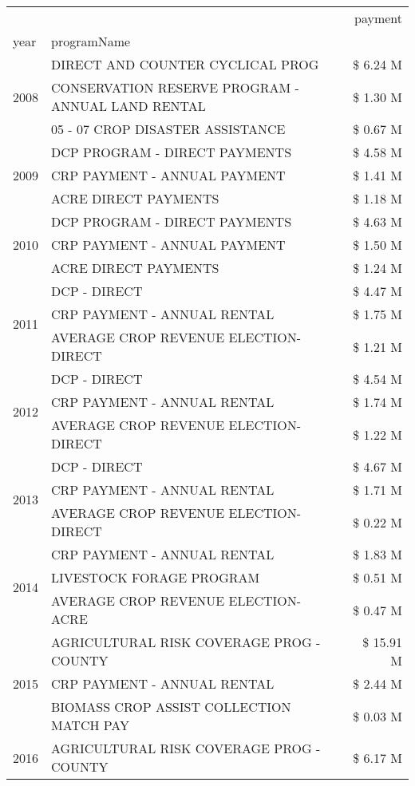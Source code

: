 \begin{tabular}{llr}
\toprule
 &  & payment \\
year & programName &  \\
\midrule
\multirow[t]{3}{*}{2008} & DIRECT AND COUNTER CYCLICAL PROG & \$ 6.24 M \\
 & CONSERVATION RESERVE PROGRAM - ANNUAL LAND RENTAL & \$ 1.30 M \\
 & 05 - 07 CROP DISASTER ASSISTANCE & \$ 0.67 M \\
\cline{1-3}
\multirow[t]{3}{*}{2009} & DCP PROGRAM - DIRECT PAYMENTS & \$ 4.58 M \\
 & CRP PAYMENT - ANNUAL PAYMENT & \$ 1.41 M \\
 & ACRE DIRECT PAYMENTS & \$ 1.18 M \\
\cline{1-3}
\multirow[t]{3}{*}{2010} & DCP PROGRAM - DIRECT PAYMENTS & \$ 4.63 M \\
 & CRP PAYMENT - ANNUAL PAYMENT & \$ 1.50 M \\
 & ACRE DIRECT PAYMENTS & \$ 1.24 M \\
\cline{1-3}
\multirow[t]{3}{*}{2011} & DCP - DIRECT & \$ 4.47 M \\
 & CRP PAYMENT - ANNUAL RENTAL & \$ 1.75 M \\
 & AVERAGE CROP REVENUE ELECTION-DIRECT & \$ 1.21 M \\
\cline{1-3}
\multirow[t]{3}{*}{2012} & DCP - DIRECT & \$ 4.54 M \\
 & CRP PAYMENT - ANNUAL RENTAL & \$ 1.74 M \\
 & AVERAGE CROP REVENUE ELECTION-DIRECT & \$ 1.22 M \\
\cline{1-3}
\multirow[t]{3}{*}{2013} & DCP - DIRECT & \$ 4.67 M \\
 & CRP PAYMENT - ANNUAL RENTAL & \$ 1.71 M \\
 & AVERAGE CROP REVENUE ELECTION-DIRECT & \$ 0.22 M \\
\cline{1-3}
\multirow[t]{3}{*}{2014} & CRP PAYMENT - ANNUAL RENTAL & \$ 1.83 M \\
 & LIVESTOCK FORAGE PROGRAM & \$ 0.51 M \\
 & AVERAGE CROP REVENUE ELECTION-ACRE & \$ 0.47 M \\
\cline{1-3}
\multirow[t]{3}{*}{2015} & AGRICULTURAL RISK COVERAGE PROG - COUNTY & \$ 15.91 M \\
 & CRP PAYMENT - ANNUAL RENTAL & \$ 2.44 M \\
 & BIOMASS CROP ASSIST COLLECTION MATCH PAY & \$ 0.03 M \\
\cline{1-3}
\multirow[t]{3}{*}{2016} & AGRICULTURAL RISK COVERAGE PROG - COUNTY & \$ 6.17 M \\

\end{tabular}
